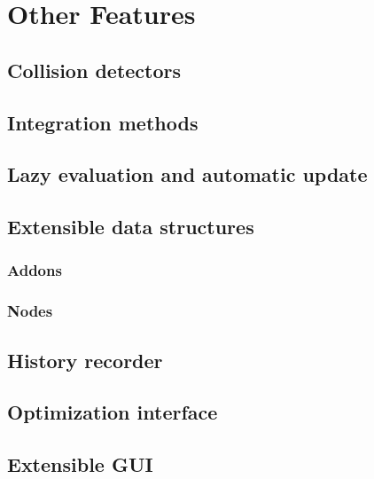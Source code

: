 \section{Other Features}
\subsection{Collision detectors}
\subsection{Integration methods}
\subsection{Lazy evaluation and automatic update}
\label{sec:lazy}
\subsection{Extensible data structures}
\subsubsection{Addons}
\label{sec:addons}
\subsubsection{Nodes}
\label{sec:nodes}
\subsection{History recorder}
\subsection{Optimization interface}
\label{sec:optimizer}
\subsection{Extensible GUI}
